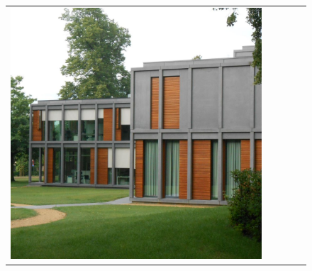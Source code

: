 \begin{figure}[H]
{\begin{tabular}{@{}ccccc@{}}
      \includegraphics[width=\linewidth]{Images/LoRAs/Modulariteit/Training_images/10.JPG} \\[2pt]


\end{tabular}}
\end{figure}
